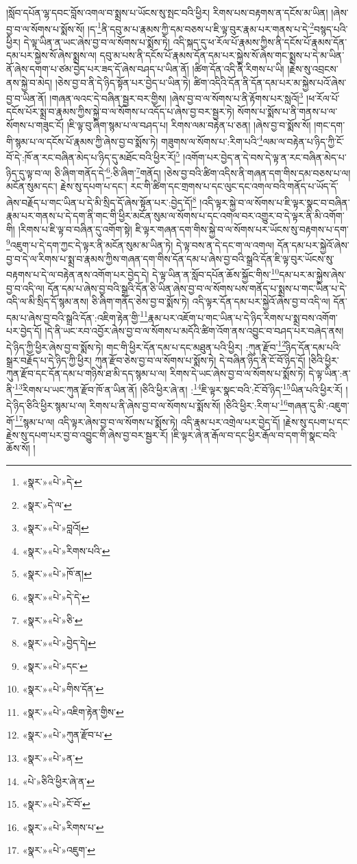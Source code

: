 །སློབ་དཔོན་ལྷ་དབང་བློས་འགལ་བ་སྨྲས་པ་ཡོངས་སུ་སྤང་བའི་ཕྱིར། རིགས་པས་བརྟགས་ན་དངོས་མ་ཡིན། །ཞེས་བྱ་བ་ལ་སོགས་པ་སྨོས་སོ། །ད་\footnote{«སྣར་»«པེ་»དེ་}ནི་དབུ་མ་པ་རྣམས་ཀྱི་དམ་བཅས་པ་ཇི་ལྟ་བུར་རྣམ་པར་གནས་པ་དེ་\footnote{«སྣར་»དེ་ལ་}བསྙད་པའི་ཕྱིར། དེ་ལྟ་ཡིན་ན་ཡང་ཞེས་བྱ་བ་ལ་སོགས་པ་སྨོས་ཏེ། འདི་སྐད་དུ་ཕ་རོལ་པོ་རྣམས་ཀྱིས་ནི་དངོས་པོ་རྣམས་དོན་དམ་པར་སྐྱེས་སོ་ཞེས་སྨྲས་ལ། དབུ་མ་པས་ནི་དངོས་པོ་རྣམས་དོན་དམ་པར་སྐྱེས་སོ་ཞེས་གང་སྨྲས་པ་དེ་མ་ཡིན་ནོ་ཞེས་དགག་པ་ཙམ་བྱེད་པར་ཟད་དོ་ཞེས་བཤད་པ་ཡིན་ནོ། །ཚིག་དོན་འདི་ནི་རིགས་པ་ཡི། །རྗེས་སུ་འབྲངས་ནས་སྐྱེ་བ་མེད། །ཅེས་བྱ་བ་ནི་དེ་ཉིད་སྟོན་པར་བྱེད་པ་ཡིན་ཏེ། ཚིག་འདིའི་དོན་ནི་དོན་དམ་པར་མ་སྐྱེས་པའོ་ཞེས་བྱ་བ་ཡིན་ནོ། །གཞན་ལའང་དེ་བཞིན་སྦྱར་བར་གྱིས། །ཞེས་བྱ་བ་ལ་སོགས་པ་ནི་རྟོགས་པར་སླའོ།\footnote{«སྣར་»«པེ་»བླའོ།} །ཕ་རོལ་པོ་དངོས་པོར་སྨྲ་བ་རྣམས་ཀྱིས་སྐྱེ་བ་ལ་སོགས་པ་འདོད་པ་ཞེས་བྱ་བར་སྦྱར་ཏེ། སོགས་པ་སྨོས་པ་ནི་གནས་པ་ལ་སོགས་པ་གཟུང་ངོ། །ཇི་ལྟ་བུ་ཞིག་སྙམ་པ་ལ་བཤད་པ། རིགས་ལམ་བརྟེན་པ་ཅན། །ཞེས་བྱ་བ་སྨོས་སོ། །གང་དག་གི་སྙམ་པ་ལ་དངོས་པོ་རྣམས་ཀྱི་ཞེས་བྱ་བ་སྨོས་ཏེ། གཟུགས་ལ་སོགས་པ་:རིག་པའི་\footnote{«སྣར་»«པེ་»རིགས་པའི་}ལམ་ལ་བརྟེན་པ་ཉིད་ཀྱི་ངོ་བོ་དེ་:ཁོ་ན་རང་བཞིན་མེད་པ་ཉིད་དུ་མཐོང་བའི་ཕྱིར་རོ།\footnote{«སྣར་»«པེ་»ཁོ་ན།} །འགོག་པར་བྱེད་ན་དེ་བས་དེ་ལྟ་ན་རང་བཞིན་མེད་པ་ཉིད་དུ་ལྟ་བ་ལ། ཅི་ཞིག་གནོད་དེ་\footnote{«སྣར་»«པེ་»དེ་དེ་}:ཅི་ཞིག་\footnote{«སྣར་»«པེ་»ཅི་}གནོད། །ཅེས་བྱ་བའི་ཚིག་འདིས་ནི་གཞན་དག་གིས་དམ་བཅས་པ་ལ། མངོན་སུམ་དང་། རྗེས་སུ་དཔག་པ་དང་། རང་གི་ཚིག་དང་གྲགས་པ་དང་ལུང་དང་འགལ་བའི་གནོད་པ་ཡོད་དོ་ཞེས་བརྗོད་པ་གང་ཡིན་པ་དེ་མི་སྲིད་དོ་ཞེས་སྟོན་པར་:བྱེད་དོ།\footnote{«སྣར་»«པེ་»བྱེད་དེ།} །འདི་ལྟར་སྐྱེ་བ་ལ་སོགས་པ་ཇི་ལྟར་སྣང་བ་བཞིན་རྣམ་པར་གནས་པ་དེ་དག་ནི་གང་གི་ཕྱིར་མངོན་སུམ་ལ་སོགས་པ་དང་འགལ་བར་འགྱུར་བ་དེ་ལྟར་ནི་མི་འགོག་གི། །རིགས་པ་ཇི་ལྟ་བ་བཞིན་དུ་འགོག་སྟེ། ཇི་ལྟར་གཞན་དག་གིས་སྐྱེ་བ་ལ་སོགས་པར་ཡོངས་སུ་བརྟགས་པ་དག་\footnote{«སྣར་»«པེ་»དང་}འཇུག་པ་དེ་དག་ཀྱང་དེ་ལྟར་ནི་མངོན་སུམ་མ་ཡིན་ཏེ། དེ་ལྟ་བས་ན་དེ་དང་ག་ལ་འགལ། དོན་དམ་པར་སྐྱེའོ་ཞེས་བྱ་བ་དེ་ལ་རིགས་པ་སྨྲ་བ་རྣམས་ཀྱིས་གཞན་དག་གིས་དོན་དམ་པ་ཞེས་བྱ་བའི་སྒྲའི་དོན་ཇི་ལྟ་བུར་ཡོངས་སུ་བརྟགས་པ་དེ་ལ་བརྟེན་ནས་འགོག་པར་བྱེད་དེ། དེ་ལྟ་ཡིན་ན་སློབ་དཔོན་ཆོས་སྐྱོང་གིས་\footnote{«སྣར་»«པེ་»གིས་དོན་}དམ་པར་མ་སྐྱེས་ཞེས་བྱ་བ་འདི་ལ། དོན་དམ་པ་ཞེས་བྱ་བའི་སྒྲའི་དོན་ཅི་ཡིན་ཞེས་བྱ་བ་ལ་སོགས་པས་གནོད་པ་སྨྲས་པ་གང་ཡིན་པ་དེ་འདི་ལ་མི་སྲིད་དོ་སྙམ་ནས། ཅི་ཞིག་གནོད་ཅེས་བྱ་བ་སྨོས་ཏེ། འདི་ལྟར་དོན་དམ་པར་སྐྱེའོ་ཞེས་བྱ་བ་འདི་ལ། དོན་དམ་པ་ཞེས་བྱ་བའི་སྒྲའི་དོན་:འཇིག་རྟེན་གྱི་\footnote{«སྣར་»«པེ་»འཇིག་རྟེན་གྱིས་}རྣམ་པར་འཇོག་པ་གང་ཡིན་པ་དེ་ཉིད་རིགས་པ་སྨྲ་བས་འགོག་པར་བྱེད་དོ། །དེ་ནི་ཡང་རབ་འབྱོར་ཞེས་བྱ་བ་ལ་སོགས་པ་མདོའི་ཚིག་འོག་ནས་འབྱུང་བ་བཤད་པར་བཞེད་ནས། དེ་ཉིད་ཀྱི་ཕྱིར་ཞེས་བྱ་བ་སྨོས་ཏེ། གང་གི་ཕྱིར་དོན་དམ་པ་དང་མཐུན་པའི་ཕྱིར། :ཀུན་རྫོབ་\footnote{«སྣར་»«པེ་»ཀུན་རྫོབ་པ་}ཉིད་དོན་དམ་པའི་སྒྲར་བརྗོད་པ་དེ་ཉིད་ཀྱི་ཕྱིར། ཀུན་རྫོབ་ཅེས་བྱ་བ་ལ་སོགས་པ་སྨོས་ཏེ། དེ་བཞིན་ཉིད་ནི་ངོ་བོ་ཉིད་དོ། །ཅིའི་ཕྱིར་ཀུན་རྫོབ་དང་དོན་དམ་པ་གཉིས་ཐ་མི་དད་སྙམ་པ་ལ། རིགས་དེ་ཡང་ཞེས་བྱ་བ་ལ་སོགས་པ་སྨོས་ཏེ། དེ་ལྟ་ཡིན་:ན་ནི་\footnote{«སྣར་»«པེ་»ན་}རིགས་པ་ཡང་ཀུན་རྫོབ་ཁོ་ན་ཡིན་ནོ། །ཅིའི་ཕྱིར་ཞེ་ན། :\footnote{«པེ་»ཅིའི་ཕྱིར་ཞེ་ན་}ཇི་ལྟར་སྣང་བའི་:ངོ་བོ་ཉིད་\footnote{«སྣར་»«པེ་»ངོ་བོ་}ཡིན་པའི་ཕྱིར་རོ། །དེ་ཉིད་ཅིའི་ཕྱིར་སྙམ་པ་ལ། རིགས་པ་ནི་ཞེས་བྱ་བ་ལ་སོགས་པ་སྨོས་སོ། །ཅིའི་ཕྱིར་:རིག་པ་\footnote{«སྣར་»«པེ་»རིགས་པ་}གཞན་དུ་མི་:འཇུག་གོ་\footnote{«སྣར་»«པེ་»འཇུག་}སྙམ་པ་ལ། འདི་ལྟར་ཞེས་བྱ་བ་ལ་སོགས་པ་སྨོས་ཏེ། འདི་རྣམ་པར་འགྲེལ་པར་བྱེད་དོ། །རྗེས་སུ་དཔག་པ་དང་རྗེས་སུ་དཔག་པར་བྱ་བ་འབྱུང་གི་ཞེས་བྱ་བར་སྦྱར་རོ། །ཇི་ལྟར་ཞེ་ན་རྒོལ་བ་དང་ཕྱིར་རྒོལ་བ་དག་གི་སྣང་བའི་ཆོས་སོ། །
